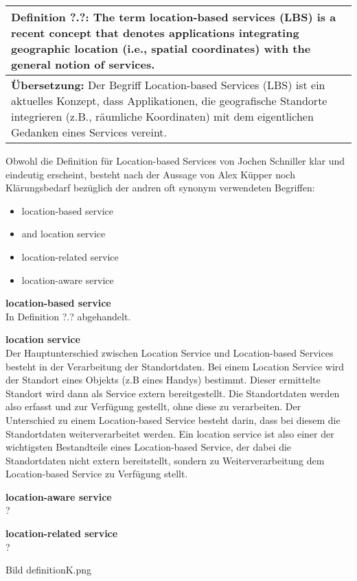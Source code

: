 \begin{table}[h]
	\centering
	\begin{tabular}{|p{16cm}|}\hline
		\textbf{Definition ?.?:} \glqq The term location-based services (LBS) is a recent concept that denotes applications integrating geographic location (i.e., spatial coordinates) with the general notion of services. \grqq \cite[S.1]{Schiller2004}\\ \hline
		\textbf{Übersetzung:} Der Begriff Location-based Services (LBS) ist ein aktuelles Konzept, dass Applikationen, die geografische Standorte integrieren (z.B., räumliche Koordinaten) mit dem eigentlichen Gedanken eines Services vereint. \\ \hline
	\end{tabular}
\end{table}

Obwohl die Definition für Location-based Services von Jochen Schniller klar und eindeutig erscheint, besteht nach der Aussage von Alex Küpper noch Klärungsbedarf bezüglich der andren oft synonym verwendeten Begriffen:
\begin{itemize}
\item location-based service
\item and location service
\item location-related service
\item location-aware service
\end{itemize}

\textbf{location-based service} \\
In Definition ?.? abgehandelt.


\textbf{location service} \\
Der Hauptunterschied zwischen Location Service und Location-based Services besteht in der Verarbeitung der Standortdaten. Bei einem Location Service wird der Standort eines Objekts (z.B eines Handys) bestimmt. Dieser ermittelte Standort wird dann als Service extern bereitgestellt. Die Standortdaten werden also erfasst und zur Verfügung gestellt, ohne diese zu verarbeiten.
Der Unterschied zu einem Location-based Service besteht darin, dass bei diesem die Standortdaten weiterverarbeitet werden. Ein location service ist also einer der wichtigsten Bestandteile eines Location-based Service, der dabei die Standortdaten nicht extern bereitstellt, sondern zu Weiterverarbeitung dem Location-based Service zu Verfügung stellt.

\textbf{location-aware service} \\
?

\textbf{location-related service} \\
?


Bild definitionK.png

